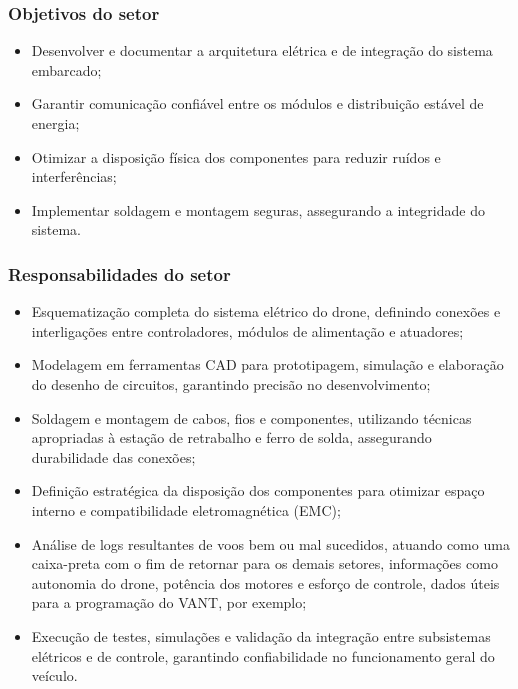 \subsubsection{Objetivos do setor}

\begin{itemize}
    \item Desenvolver e documentar a arquitetura elétrica e de integração do sistema embarcado;
    \item Garantir comunicação confiável entre os módulos e distribuição estável de energia;
    \item Otimizar a disposição física dos componentes para reduzir ruídos e interferências;
    \item Implementar soldagem e montagem seguras, assegurando a integridade do sistema.
\end{itemize}

\subsubsection{Responsabilidades do setor}

\begin{itemize}
    \item Esquematização completa do sistema elétrico do drone, definindo conexões e interligações entre controladores, módulos de alimentação e atuadores;
    \item Modelagem em ferramentas CAD para prototipagem, simulação e elaboração do desenho de circuitos, garantindo precisão no desenvolvimento;
    \item Soldagem e montagem de cabos, fios e componentes, utilizando técnicas apropriadas à estação de retrabalho e ferro de solda, assegurando durabilidade das conexões;
    \item Definição estratégica da disposição dos componentes para otimizar espaço interno e compatibilidade eletromagnética (EMC);
    \item Análise de logs resultantes de voos bem ou mal sucedidos, atuando como uma caixa-preta com o fim de retornar para os demais setores, informações como autonomia do drone, potência dos motores e esforço de controle, dados úteis para a programação do VANT, por exemplo;
    \item Execução de testes, simulações e validação da integração entre subsistemas elétricos e de controle, garantindo confiabilidade no funcionamento geral do veículo.
\end{itemize}
